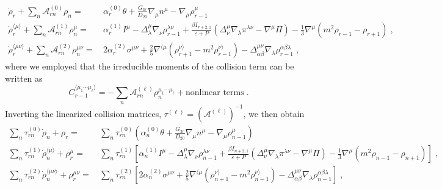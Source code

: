 \documentclass[a4paper, amsfonts, amssymb, amsmath, reprint, showkeys, nofootinbib, twoside, onecolumn,notitlepage]{revtex4-2}
\begin{document}
\begin{subequations}\label{eq:rhodot_all_linear}
\begin{align}
 \dot{\rho}_r +\sum_n \mathcal{A}_{rn}^{(0)} \rho_n =&\, \alpha_r^{(0)} \theta  + 
 \frac{G_{3r}}{D_{20}} \nabla_\mu n^\mu
 - \nabla_\mu \rho^\mu_{r-1}\label{eq:rhodot_l0_linear}\\
%
 \dot{\rho}^{\langle\mu\rangle}_r+ \sum_n \mathcal{A}_{rn}^{(1)} \rho_n^\mu =&\, \alpha_r^{(1)} I^\mu 
 - \Delta^\mu_\lambda \nabla_\nu \rho^{\lambda \nu}_{r-1} 
 + \frac{\beta I_{r+2,1}}{\varepsilon + P} 
 (\Delta^\mu_\nu \nabla_\lambda \pi^{\lambda \nu}- \nabla^\mu \Pi ) 
 -\frac{1}{3} \nabla^\mu (m^2 \rho_{r-1} - \rho_{r+1}) 
 \;,
 \label{eq:rhodot_l1_linear} \\
 \dot{\rho}^{\langle \mu\nu\rangle}_r + \sum_n \mathcal{A}_{rn}^{(2)} \rho_n^{\mu\nu} =& \,
 2 \alpha^{(2)}_r \sigma^{\mu\nu}+ 
 \frac{2}{5} \nabla^{\langle \mu} (\rho^{\nu \rangle}_{r+1} - m^2 \rho^{\nu\rangle}_{r-1})  - \Delta^{\mu\nu}_{\alpha\beta} 
 \nabla_\lambda \rho^{\alpha\beta\lambda}_{r-1} \;,
 \label{eq:rhodot_l2_linear}
\end{align}
\end{subequations}
where we employed that the irreducible moments of the collision term can be written as
\begin{equation}
    C_{r-1}^{\langle\mu_1\cdots \mu_\ell\rangle}= -\sum_{n}\mathcal{A}_{rn}^{(\ell)}\rho_n^{\mu_1\cdots\mu_\ell}+\text{nonlinear terms}\;.
\end{equation}
Inverting the linearized collision matrices, $\tau^{(\ell)}=(\mathcal{A}^{(\ell)})^{-1}$, we then obtain
\begin{subequations}\label{eq:rhodot_all_linear_2}
\begin{align}
 \sum_n \tau_{rn}^{(0)}\dot{\rho}_n + \rho_r =&\,\sum_n \tau_{rn}^{(0)}\left( \alpha_n^{(0)} \theta  + 
 \frac{G_{3r}}{D_{20}} \nabla_\mu n^\mu
 - \nabla_\mu \rho^\mu_{n-1}\right)\label{eq:rhodot_l0_linear_2}\\
%
 \sum_n \tau_{rn}^{(1)}\dot{\rho}^{\langle\mu\rangle}_n+  \rho_r^\mu =&\,\sum_n \tau_{rn}^{(1)}\left[ \alpha_n^{(1)} I^\mu 
 - \Delta^\mu_\lambda \nabla_\nu \rho^{\lambda \nu}_{n-1} 
 + \frac{\beta I_{n+2,1}}{\varepsilon + P} 
 (\Delta^\mu_\nu \nabla_\lambda \pi^{\lambda \nu}- \nabla^\mu \Pi ) 
 -\frac{1}{3} \nabla^\mu (m^2 \rho_{n-1} - \rho_{n+1}) \right]
 \;,
 \label{eq:rhodot_l1_linear_2} \\
 \sum_n \tau_{rn}^{(2)} \dot{\rho}^{\langle \mu\nu\rangle}_n + \rho_r^{\mu\nu} =& \, \sum_n \tau_{rn}^{(2)}\left[
 2 \alpha^{(2)}_n \sigma^{\mu\nu}+ 
 \frac{2}{5} \nabla^{\langle \mu} (\rho^{\nu \rangle}_{n+1} - m^2 \rho^{\nu\rangle}_{n-1})  - \Delta^{\mu\nu}_{\alpha\beta} 
 \nabla_\lambda \rho^{\alpha\beta\lambda}_{n-1}\right] \;,
 \label{eq:rhodot_l2_linear_2}
\end{align}
\end{subequations}
\end{document}
